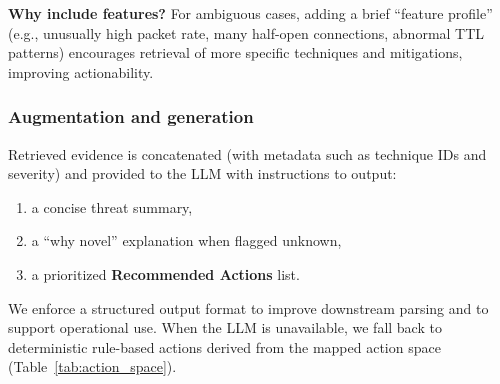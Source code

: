 \textbf{Why include features?} For ambiguous cases, adding a brief ``feature profile'' (e.g., unusually high packet rate, many half-open connections, abnormal TTL patterns) encourages retrieval of more specific techniques and mitigations, improving actionability.

\subsubsection{Augmentation and generation}
Retrieved evidence is concatenated (with metadata such as technique IDs and severity) and provided to the LLM with instructions to output:
\begin{enumerate}
  \item a concise threat summary,
  \item a ``why novel'' explanation when flagged unknown,
  \item a prioritized \textbf{Recommended Actions} list.
\end{enumerate}
We enforce a structured output format to improve downstream parsing and to support operational use. When the LLM is unavailable, we fall back to deterministic rule-based actions derived from the mapped action space (Table~\ref{tab:action_space}).

